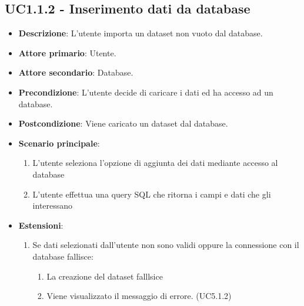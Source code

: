 \subsection{UC1.1.2 - Inserimento dati da database}
\label{ssub:UC1.1.2}
\begin{itemize}
    \item \textbf{Descrizione}: L'utente importa un dataset non vuoto dal database.

    \item \textbf{Attore primario}: Utente.
    
    \item \textbf{Attore secondario}: Database.
    
    \item \textbf{Precondizione}:   L'utente decide di caricare i dati ed ha accesso ad un database.

    \item \textbf{Postcondizione}:  Viene caricato un dataset dal database.

	\item \textbf{Scenario principale}:
		\begin{enumerate}
			\item L'utente seleziona l'opzione di aggiunta dei dati mediante accesso al database
			\item L'utente effettua una query SQL che ritorna i campi e dati che gli interessano
        \end{enumerate}

    \item \textbf{Estensioni}:
        \begin{enumerate}   
            \item Se dati selezionati dall'utente non sono validi oppure la connessione con il database fallisce:
            \begin{enumerate}
                \item La creazione del dataset falllsice
                \item Viene visualizzato il messaggio di errore. (UC5.1.2)
            \end{enumerate}
         \end{enumerate}
\end{itemize}


